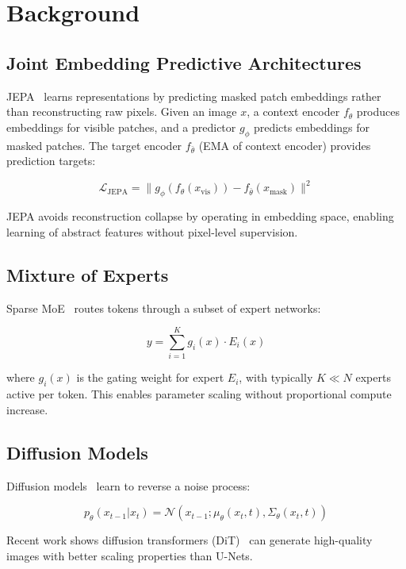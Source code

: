 \section{Background}


\subsection{Joint Embedding Predictive Architectures}

JEPA~\cite{jepa2022} learns representations by predicting masked patch embeddings rather than reconstructing raw pixels. Given an image $x$, a context encoder $f_\theta$ produces embeddings for visible patches, and a predictor $g_\phi$ predicts embeddings for masked patches. The target encoder $f_{\bar{\theta}}$ (EMA of context encoder) provides prediction targets:

\begin{equation}
    \mathcal{L}_{\text{JEPA}} = \|g_\phi(f_\theta(x_{\text{vis}})) - f_{\bar{\theta}}(x_{\text{mask}})\|^2
\end{equation}

JEPA avoids reconstruction collapse by operating in embedding space, enabling learning of abstract features without pixel-level supervision.

\subsection{Mixture of Experts}

Sparse MoE~\cite{moe2017} routes tokens through a subset of expert networks:

\begin{equation}
    y = \sum_{i=1}^{K} g_i(x) \cdot E_i(x)
\end{equation}

where $g_i(x)$ is the gating weight for expert $E_i$, with typically $K \ll N$ experts active per token. This enables parameter scaling without proportional compute increase.

\subsection{Diffusion Models}

Diffusion models~\cite{ddpm2020} learn to reverse a noise process:

\begin{equation}
    p_\theta(x_{t-1}|x_t) = \mathcal{N}(x_{t-1}; \mu_\theta(x_t, t), \Sigma_\theta(x_t, t))
\end{equation}

Recent work shows diffusion transformers (DiT)~\cite{dit2023} can generate high-quality images with better scaling properties than U-Nets.

